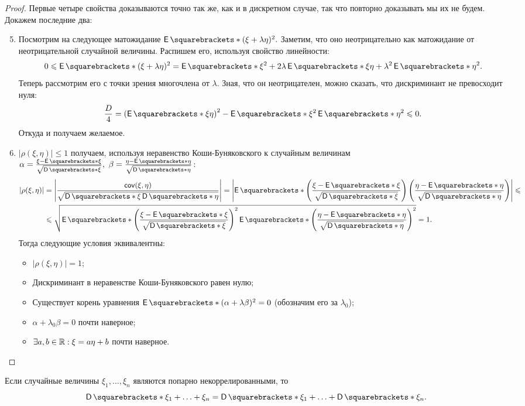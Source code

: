 \begin{proof}
	Первые четыре свойства доказываются точно так же, как и в дискретном 
	случае, так что повторно доказывать мы их не будем. Докажем последние два:
	\begin{enumerate}
		\setcounter{enumi}{4}
		\item Посмотрим на следующее матожидание \(\E{(\xi + \lambda\eta)^2}. 
		\) Заметим, что оно неотрицательно как матожидание от неотрицательной 
		случайной величины. Распишем его, используя свойство линейности: \[0 
		\leq \E{(\xi + \lambda\eta)^2} = \E{\xi^2} + 2\lambda\E{\xi\eta} + 
		\lambda^2\E{\eta^2}.\] Теперь рассмотрим его с точки зрения многочлена 
		от \(\lambda\). Зная, что он неотрицателен, можно сказать, что 
		дискриминант не превосходит нуля: \[ \frac{D}{4} = \left(\E{\xi\eta} 
		\right)^2 - \E{\xi^2}\E{\eta^2} \leq 0. \] Откуда и получаем желаемое.
		
		\item \(\left|\rho(\xi, \eta)\right| \leq 1\) получаем, используя 
		неравенство Коши-Буняковского к случайным величинам \(\alpha = 
		\frac{\xi - \E{\xi}}{\sqrt{\D{\xi}}},\ \beta = \frac{\eta - 
		\E{\eta}}{\sqrt{\D{\eta}}}\):
		\begin{align}
			\left|\rho(\xi, \eta)\right| &= \left|\frac{\cov(\xi, 
			\eta)}{\sqrt{\D{\xi}\D{\eta}}}\right| = \left|\E{\left(\frac{\xi - 
			\E{\xi}}{\sqrt{\D{\xi}}}\right)\left(\frac{\eta - 
			\E{\eta}}{\sqrt{\D{\eta}}}\right)}\right| \leq \\
			&\leq \sqrt{\E{\left(\frac{\xi - 
			\E{\xi}}{\sqrt{\D{\xi}}}\right)^2}\E{\left(\frac{\eta - 
			\E{\eta}}{\sqrt{\D{\eta}}}\right)^2}} = 1.
		\end{align}
		Тогда следующие условия эквивалентны:
		\begin{itemize}
			\item \(\left|\rho(\xi, \eta) \right| = 1\);
			\item Дискриминант в неравенстве Коши-Буняковского равен нулю;
			\item Существует корень уравнения \(\E{(\alpha + \lambda\beta)^2} 
			= 0\) (обозначим его за \(\lambda_0\));
			\item \(\alpha + \lambda_0\beta = 0\) почти наверное;
			\item \(\exists a,b \in \mathbb{R} : \xi = a\eta + b\) почти наверное. 
		\end{itemize}
	\end{enumerate}
\end{proof}
\begin{consequence}
	Если случайные величины \(\xi_1, \ldots, \xi_n \) являются попарно 
	некоррелированными, то \[\D{\xi_1 + \ldots + \xi_n} = \D{\xi_1} + \ldots + 
	\D{\xi_n}. \]
\end{consequence}
